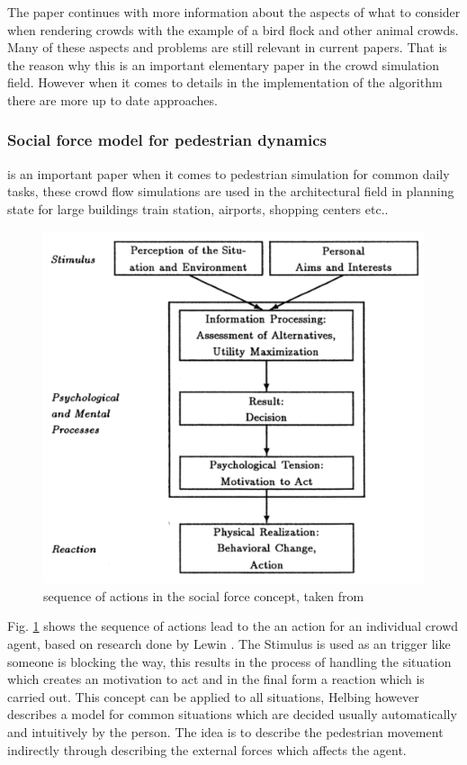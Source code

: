\documentclass{acmsiggraph}               %
\begin{document}
The paper continues with more information about the aspects of what to consider when rendering crowds with the example of a bird flock and other animal crowds. Many of these aspects and problems are still relevant in current papers. That is the reason why this is an important elementary paper in the crowd simulation field. However when it comes to details in the implementation of the algorithm there are more up to date approaches. 

\subsubsection{Social force model for pedestrian dynamics}\cite{helbing_social_1995} is an important paper when it comes to pedestrian simulation for common daily tasks, these crowd flow simulations are used in the architectural field in planning state for large buildings train station, airports, shopping centers etc.. 
\begin{figure}[h]
  \centering
  \includegraphics[width=1\linewidth]{images/helbingSocialForceConceptScheme.png}
  \caption{sequence of actions in the social force concept, taken from \protect\cite{helbing_social_1995}}
  \label{fig:helbingSchema}
\end{figure}
Fig. \ref{fig:helbingSchema} shows the sequence of actions lead to the an action for an individual crowd agent, based on research done by Lewin \cite{lewin_field_1951}. The Stimulus is used as an trigger like someone is blocking the way, this results in the process of handling the situation which creates an motivation to act and in the final form a reaction which is carried out. This concept can be applied to all situations, Helbing however describes a model for common situations which are decided usually automatically and intuitively by the person. The idea is to describe the pedestrian movement indirectly through describing the external forces which affects the agent. 
\end{document}
